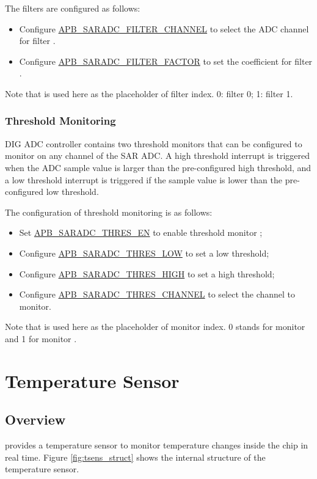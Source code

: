 \documentclass[main\_\_EN.tex]{subfiles}
\begin{document}
The filters are configured as follows:
\begin{itemize}
\item Configure \hyperref[fielddesc:APBSARADCFILTERCHANNEL1]{APB\_SARADC\_FILTER\_CHANNEL} to select the ADC channel for filter .
\item Configure \hyperref[fielddesc:APBSARADCFILTERCHANNEL1]{APB\_SARADC\_FILTER\_FACTOR} to set the coefficient for filter .
\end{itemize}

Note that  is used here as the placeholder of filter index. 0: filter 0; 1: filter 1.

\subsubsection{Threshold Monitoring}
DIG ADC controller contains two threshold monitors that can be configured to monitor on any channel of the SAR ADC. A high threshold interrupt is triggered when the ADC sample value is larger than the pre-configured high threshold, and a low threshold interrupt is triggered if the sample value is lower than the pre-configured low threshold.

The configuration of threshold monitoring is as follows:
\begin{itemize}
    \item Set \hyperref[fielddesc:APBSARADCTHRESALLEN]{APB\_SARADC\_THRES\_EN} to enable threshold monitor ;
    \item Configure \hyperref[fielddesc:APBSARADCTHRES1LOW]{APB\_SARADC\_THRES\_LOW} to set a low threshold;
    \item Configure \hyperref[fielddesc:APBSARADCTHRES1LOW]{APB\_SARADC\_THRES\_HIGH} to set a high threshold;
    \item Configure \hyperref[fielddesc:APBSARADCTHRES1LOW]{APB\_SARADC\_THRES\_CHANNEL} to select the channel to monitor.
\end{itemize}

Note that  is used here as the placeholder of monitor index. 0 stands for monitor and 1  for monitor .


\section{Temperature Sensor}\label{sec:sensor-temp-sensor}
\subsection{Overview}
\chipname{} provides a temperature sensor to monitor temperature changes inside the chip in real time. Figure \ref{fig:tsens_struct} shows the internal structure of the temperature sensor.
\end{document}
